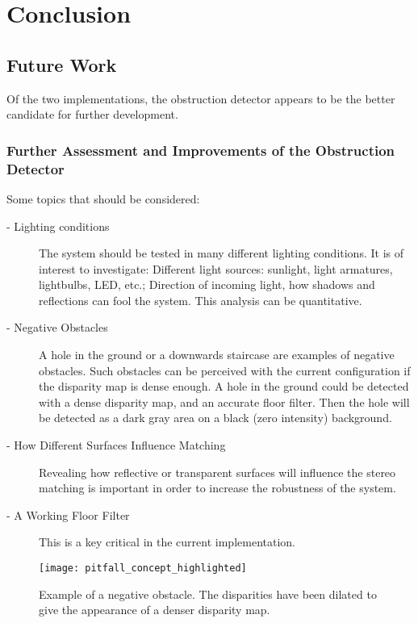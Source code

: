 \chapter{Conclusion}

\section{Future Work}

Of the two implementations, the obstruction detector appears to be the better candidate for further development. 

\subsection{Further Assessment and Improvements of the Obstruction Detector}

Some topics that should be considered:

\begin{description}

\item[- Lighting conditions] The system should be tested in many different lighting conditions. It is of interest to investigate: Different light sources: sunlight, light armatures, lightbulbs, LED, etc.; Direction of incoming light, how shadows and reflections can fool the system. This analysis can be quantitative. 

\item[- Negative Obstacles] A hole in the ground or a downwards staircase are examples of negative obstacles. Such obstacles can be perceived with the current configuration if the disparity map is dense enough. A hole in the ground could be detected with a dense disparity map, and an accurate floor filter. Then the hole will be detected as a dark gray area on a black (zero intensity)  background.

\item[- How Different Surfaces Influence Matching] Revealing how reflective or transparent surfaces will influence the stereo matching is important in order to increase the robustness of the system.

\item[- A Working Floor Filter] This is a key critical in the current implementation.

\end{description}

\begin{wrapfigure}{r}{0.55\textwidth}
	\vspace{-10pt} %
	\centering
	\texttt{[image: pitfall\_concept\_highlighted]}
	\caption{\label{fig:pitfall} Example of a negative obstacle. The disparities have been dilated to give the appearance of a denser disparity map.}
\end{wrapfigure}



